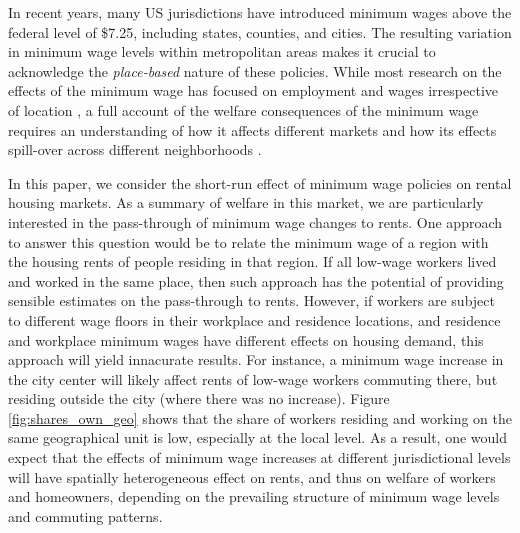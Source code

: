 

In recent years, many US jurisdictions have introduced minimum wages above the 
federal level of \$7.25, including states, counties, and cities.
The resulting variation in minimum wage levels within metropolitan areas makes it 
crucial to acknowledge the \textit{place-based} nature of these policies.
While most research on the effects of the minimum wage has focused on employment 
and wages irrespective of location \parencite[e.g.,][]{AutorEtAl2016,CegnizEtAl2019}, 
a full account of the welfare consequences of the minimum wage requires an 
understanding of how it affects different markets and how its effects spill-over 
across different neighborhoods \parencite[as recently emphasized by][]{DubeLindner2021}.

In this paper, we consider the short-run effect of minimum wage policies on rental 
housing markets.
As a summary of welfare in this market, we are particularly interested in the 
pass-through of minimum wage changes to rents.
One approach to answer this question would be to relate the minimum wage of a region
with the housing rents of people residing in that region.
If all low-wage workers lived and worked in the same place, then such approach has 
the potential of providing sensible estimates on the pass-through to rents.
However, if workers are subject to different wage floors in their workplace and
residence locations, and residence and workplace minimum wages have different 
effects on housing demand, this approach will yield innacurate results.
For instance, a minimum wage increase in the city center will likely affect rents 
of low-wage workers commuting there, but residing outside the city (where there was
no increase).
Figure \ref{fig:shares_own_geo} shows that the share of workers residing and working 
on the same geographical unit is low, especially at the local level.
As a result, one would expect that the effects of minimum wage increases at different 
jurisdictional levels will have spatially heterogeneous effect on rents, and thus 
on welfare of workers and homeowners, depending on the prevailing structure of 
minimum wage levels and commuting patterns.

